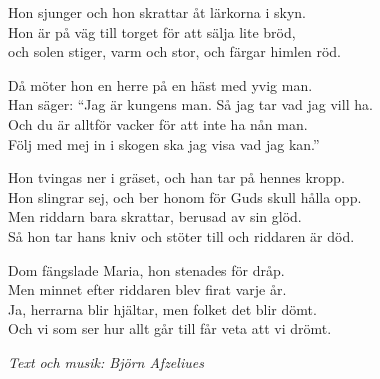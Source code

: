 \vspace{10pt}
Hon sjunger och hon skrattar åt lärkorna i skyn.\\
Hon är på väg till torget för att sälja lite bröd,\\ 
och solen stiger, varm och stor, och färgar himlen röd.\par
\vspace{10pt}
Då möter hon en herre på en häst med yvig man.\\
Han säger: ``Jag är kungens man. Så jag tar vad jag vill ha.\\ 
Och du är alltför vacker för att inte ha nån man.\\
Följ med mej in i skogen ska jag visa vad jag kan.''\par
\vspace{10pt}
Hon tvingas ner i gräset, och han tar på hennes kropp.\\
Hon slingrar sej, och ber honom för Guds skull hålla opp.\\
Men riddarn bara skrattar, berusad av sin glöd.\\
Så hon tar hans kniv och stöter till och riddaren är död.\par
\vspace{10pt}
Dom fängslade Maria, hon stenades för dråp.\\
Men minnet efter riddaren blev firat varje år.\\
Ja, herrarna blir hjältar, men folket det blir dömt.\\
Och vi som ser hur allt går till får veta att vi drömt.\par
\vspace{10pt}
{\footnotesize\textit{Text och musik: Björn Afzeliues}}



 
